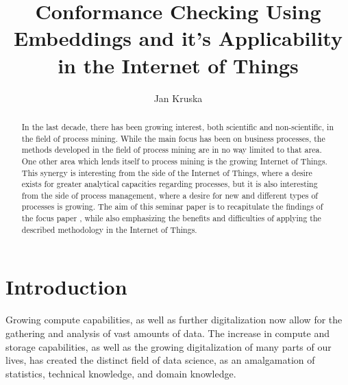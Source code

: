 \documentclass[runningheads]{template/llncs}
\begin{document}
	\title{Conformance Checking Using Embeddings and it's Applicability in the Internet of Things}
	\author{Jan Kruska}
%
\maketitle              %
%
%
%
%

\begin{abstract}
	In the last decade, there has been growing interest, both scientific and non-scientific, in the field of process mining.
	While the main focus has been on business processes, the methods developed in the field of process mining are in no way limited to that area.
	One other area which lends itself to process mining is the growing Internet of Things.
	This synergy is interesting from the side of the Internet of Things, where a desire exists for greater analytical capacities regarding processes, 
	but it is also interesting from the side of process management, where a desire for new and different types of processes is growing.
	The aim of this seminar paper is to recapitulate the findings of the focus paper \cite{PBWe20}, while also emphasizing the benefits and difficulties of applying the described methodology in the Internet of Things.
\end{abstract}

\section{Introduction}

Growing compute capabilities, as well as further digitalization now allow for the gathering and analysis of vast amounts of data.
The increase in compute and storage capabilities, as well as the growing digitalization of many parts of our lives, has created the distinct field of data science, as an amalgamation of statistics, technical knowledge, and domain knowledge.
\end{document}
